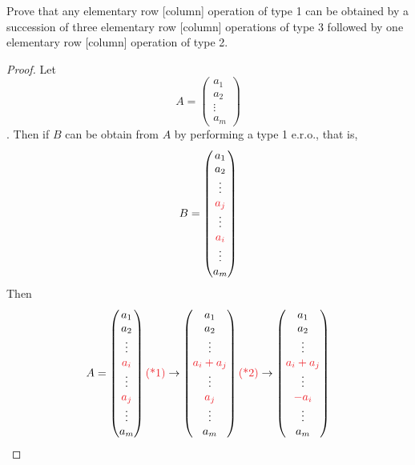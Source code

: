 \begin{exercise} \label{exercise 3.1.9}
Prove that any elementary row [column] operation of type 1 can be obtained by a succession of three elementary row [column] operations of type 3 followed by one elementary row [column] operation of type 2.
\end{exercise}

\begin{proof}
Let \[A = \begin{pmatrix} a_1 \\ a_2 \\ \vdots \\ a_m \end{pmatrix}\].
Then if \(B\) can be obtain from \(A\) by performing a type 1 e.r.o., that is,
\[
    B = \begin{pmatrix} a_1 \\ a_2 \\ \vdots \\ \RED{a_j} \\ \vdots \\ \RED{a_i} \\ \vdots \\ a_m \end{pmatrix}
\]
Then
\[
    A = \begin{pmatrix} a_1 \\ a_2 \\ \vdots \\ \RED{a_i} \\ \vdots \\ \RED{a_j} \\ \vdots \\ a_m \end{pmatrix}
    \text{\RED{(*1)}} \to \begin{pmatrix} a_1 \\ a_2 \\ \vdots \\ \RED{a_i + a_j} \\ \vdots \\ \RED{a_j} \\ \vdots \\ a_m \end{pmatrix}
    \text{\RED{(*2)}} \to \begin{pmatrix} a_1 \\ a_2 \\ \vdots \\ \RED{a_i + a_j} \\ \vdots \\ \RED{-a_i} \\ \vdots \\ a_m \end{pmatrix}
\]
\end{proof}
